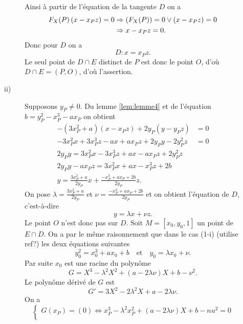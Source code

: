 \begin{demonstration}
\begin{description}
\begin{description}
                Ainsi à partir de l'équation de la tangente $D$ on a
                \begin{align*}
                    F_{X}(P)\left( x - x_Pz \right) = 0 &\Rightarrow \left( F_{X}(P) \right) = 0 \vee \left( x - x_Pz \right) = 0 \\
                                                        &\Rightarrow x - x_Pz = 0
                .\end{align*}
                Donc pour $D$ on a 
                \[
                D : x = x_Pz
                .\] 
                Le seul point de $D \cap E$ distinct de $P$ est donc le point $O$, d'où $D \cap E = \left( P,O \right)$, d'où l'assertion.
            \item[ii)] Supposons $y_P \neq 0$. Du lemme \ref{lem:lemme4}  et de l'équation $b = y_P^2 - x_P^3 - ax_P$ on obtient
                \begin{align*}
                    - \left( 3x_P^2 + a \right) \left( x - x_Pz \right) + 2y_P\left( y - y_Pz \right) &= 0 \\
                    - 3x_P^2x + 3 x_P^3z - ax + ax_Pz + 2y_Py - 2y_P^2z &= 0 \\
                    2y_Py = 3x_P^2x - 3x_P^3z + ax - ax_Pz +2y_P^2z \\
                    2y_Py - ax_Pz = 3x_P^2x + ax - x_P^3z + 2b \\
                    y = \frac{3x_P^2 + a}{2y_P}x + \frac{- x_P^3 + ax_P + 2b}{2y_P}z
                .\end{align*}
                On pose $\lambda = \frac{3x_P^2 + a}{2y_P}$ et $\nu = \frac{- x_P^3 + ax_P + 2b}{2y_P}$ et on obtient l'équation de $D$, c'est-à-dire
                \[
                y = \lambda x + \nu z
                .\] 
                Le point $O$ n'est donc pas sur $D$. Soit $M = \left[ x_0, y_0, 1 \right]$ un point de $E \cap D$. On a par le même raisonnement que dans le cas (1-i) (utilise ref?) les deux équations suivantes
                \[
                y_0^2 = x_0^3 + ax_0 + b \quad \text{et} \quad y_0 = \lambda x_0 + \nu
                .\] 
                Par suite $x_0$ est une racine du polynôme
                \[
                G = X^3 - \lambda^2 X^2 + \left( a - 2\lambda\nu  \right)X + b - \nu^2
                .\] 
                Le polynôme dérivé de $G$ est
                \[
                G' = 3X^2 - 2\lambda^2 X + a - 2\lambda\nu
                .\] 
                On a
                \[
                    \begin{cases}
                G(x_P)=(0) \iff x_P^3-\lambda^2x_P^2+\left( a-2\lambda\nu \right)X+b-nu^2=0 \\

\end{cases}\]
\end{description}
\end{description}
\end{demonstration}

